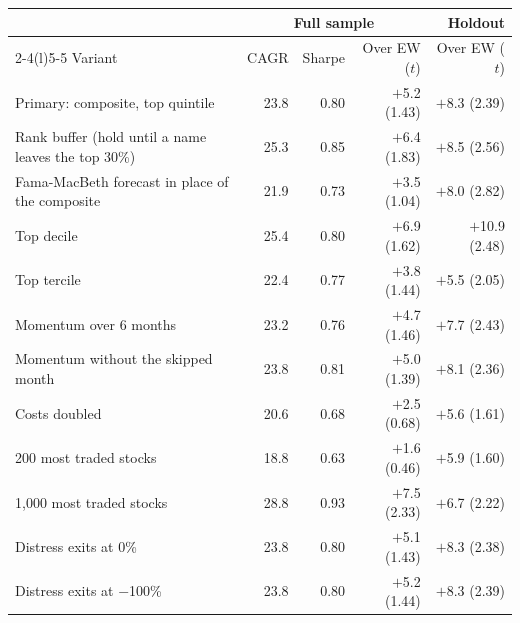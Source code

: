 \begin{tabular}{@{}lrrrr@{}}
\toprule
 & \multicolumn{3}{c}{Full sample} & Holdout \\
\cmidrule(lr){2-4}\cmidrule(l){5-5}
Variant & CAGR & Sharpe & Over EW ($t$) & Over EW ($t$) \\
\midrule
Primary: composite, top quintile & 23.8 & 0.80 & $+$5.2 (1.43) & $+$8.3 (2.39) \\
Rank buffer (hold until a name leaves the top 30\%) & 25.3 & 0.85 & $+$6.4 (1.83) & $+$8.5 (2.56) \\
Fama-MacBeth forecast in place of the composite & 21.9 & 0.73 & $+$3.5 (1.04) & $+$8.0 (2.82) \\
Top decile & 25.4 & 0.80 & $+$6.9 (1.62) & $+$10.9 (2.48) \\
Top tercile & 22.4 & 0.77 & $+$3.8 (1.44) & $+$5.5 (2.05) \\
Momentum over 6 months & 23.2 & 0.76 & $+$4.7 (1.46) & $+$7.7 (2.43) \\
Momentum without the skipped month & 23.8 & 0.81 & $+$5.0 (1.39) & $+$8.1 (2.36) \\
Costs doubled & 20.6 & 0.68 & $+$2.5 (0.68) & $+$5.6 (1.61) \\
200 most traded stocks & 18.8 & 0.63 & $+$1.6 (0.46) & $+$5.9 (1.60) \\
1,000 most traded stocks & 28.8 & 0.93 & $+$7.5 (2.33) & $+$6.7 (2.22) \\
Distress exits at 0\% & 23.8 & 0.80 & $+$5.1 (1.43) & $+$8.3 (2.38) \\
Distress exits at $-$100\% & 23.8 & 0.80 & $+$5.2 (1.44) & $+$8.3 (2.39) \\
\bottomrule
\end{tabular}
